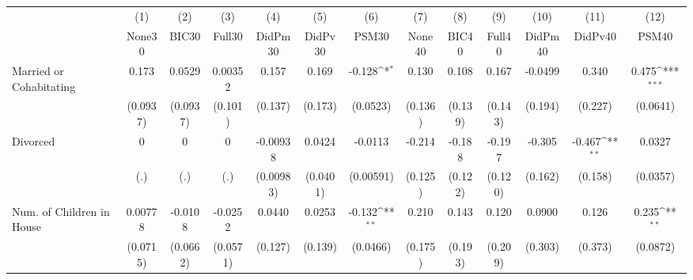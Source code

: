 {
\def\sym#1{\ifmmode^{#1}\else\(^{#1}\)\fi}
\begin{tabular}{l*{12}{c}}
\toprule
            &\multicolumn{1}{c}{(1)}&\multicolumn{1}{c}{(2)}&\multicolumn{1}{c}{(3)}&\multicolumn{1}{c}{(4)}&\multicolumn{1}{c}{(5)}&\multicolumn{1}{c}{(6)}&\multicolumn{1}{c}{(7)}&\multicolumn{1}{c}{(8)}&\multicolumn{1}{c}{(9)}&\multicolumn{1}{c}{(10)}&\multicolumn{1}{c}{(11)}&\multicolumn{1}{c}{(12)}\\
            &\multicolumn{1}{c}{None30}&\multicolumn{1}{c}{BIC30}&\multicolumn{1}{c}{Full30}&\multicolumn{1}{c}{DidPm30}&\multicolumn{1}{c}{DidPv30}&\multicolumn{1}{c}{PSM30}&\multicolumn{1}{c}{None40}&\multicolumn{1}{c}{BIC40}&\multicolumn{1}{c}{Full40}&\multicolumn{1}{c}{DidPm40}&\multicolumn{1}{c}{DidPv40}&\multicolumn{1}{c}{PSM40}\\
\midrule
Married or Cohabitating&       0.173         &      0.0529         &     0.00352         &       0.157         &       0.169         &      -0.128\sym{*}  &       0.130         &       0.108         &       0.167         &     -0.0499         &       0.340         &       0.475\sym{***}\\
            &    (0.0937)         &    (0.0937)         &     (0.101)         &     (0.137)         &     (0.173)         &    (0.0523)         &     (0.136)         &     (0.139)         &     (0.143)         &     (0.194)         &     (0.227)         &    (0.0641)         \\
\addlinespace
Divorced    &           0         &           0         &           0         &    -0.00938         &      0.0424         &     -0.0113         &      -0.214         &      -0.188         &      -0.197         &      -0.305         &      -0.467\sym{**} &      0.0327         \\
            &         (.)         &         (.)         &         (.)         &   (0.00983)         &    (0.0401)         &   (0.00591)         &     (0.125)         &     (0.122)         &     (0.120)         &     (0.162)         &     (0.158)         &    (0.0357)         \\
\addlinespace
Num. of Children in House&     0.00778         &     -0.0108         &     -0.0252         &      0.0440         &      0.0253         &      -0.132\sym{**} &       0.210         &       0.143         &       0.120         &      0.0900         &       0.126         &       0.235\sym{**} \\
            &    (0.0715)         &    (0.0662)         &    (0.0571)         &     (0.127)         &     (0.139)         &    (0.0466)         &     (0.175)         &     (0.193)         &     (0.209)         &     (0.303)         &     (0.373)         &    (0.0872)         \\

\end{tabular}}
